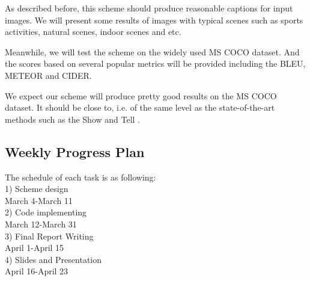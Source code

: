\documentclass[conference]{IEEEtran}
\begin{document}
As described before, this scheme should produce reasonable captions for input images. We will present some results of images with typical scenes such as sports activities, natural scenes, indoor scenes and etc.
 
Meanwhile, we will test the scheme on the widely used MS COCO dataset. And the scores based on several popular metrics will be provided including the BLEU, METEOR and CIDER. 

We expect our scheme will produce pretty good results on the MS COCO dataset. It should be close to, i.e. of the same level as the state-of-the-art methods such as the Show and Tell \cite{vinyals2015show}.

\subsection{Weekly Progress Plan}
The schedule of each task is as following:
\\1) Scheme design
\\March 4-March 11
\\2) Code implementing
\\March 12-March 31
\\3) Final Report Writing
\\April 1-April 15
\\4) Slides and Presentation
\\April 16-April 23




\end{document}
